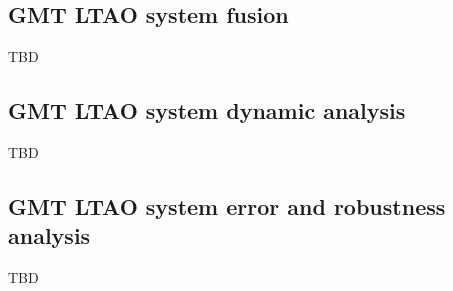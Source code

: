 \subsection{GMT LTAO system fusion}
\label{subsec:ltao-system-fusion}

TBD

\subsection{GMT LTAO system dynamic analysis}
\label{subsec:ltao-dynamics}

TBD

\subsection{GMT LTAO system error and robustness analysis}
\label{subsec:ltao-errors}

TBD